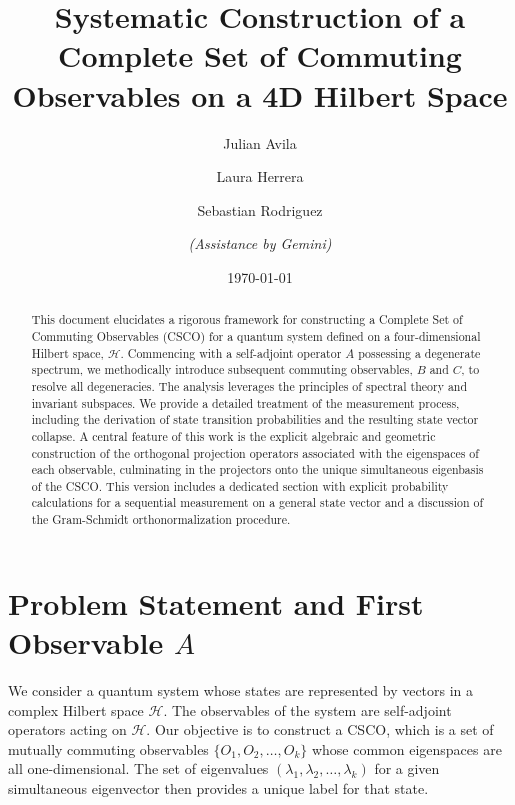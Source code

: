\documentclass[11pt,a4paper]{article}
\title{Systematic Construction of a Complete Set of Commuting Observables on a
4D Hilbert Space}
\author{Julian Avila \and Laura Herrera \and Sebastian Rodriguez \\ \and
\textit{(Assistance by Gemini)}}
\date{\today}
\begin{document}
\maketitle

\begin{abstract}
This document elucidates a rigorous framework for constructing a Complete Set of
Commuting Observables (CSCO) for a quantum system defined on a four-dimensional
Hilbert space, $\mathcal{H}$. Commencing with a self-adjoint operator $A$
possessing a degenerate spectrum, we methodically introduce subsequent commuting
observables, $B$ and $C$, to resolve all degeneracies. The analysis leverages
the principles of spectral theory and invariant subspaces. We provide a detailed
treatment of the measurement process, including the derivation of state
transition probabilities and the resulting state vector collapse. A central
feature of this work is the explicit algebraic and geometric construction of the
orthogonal projection operators associated with the eigenspaces of each
observable, culminating in the projectors onto the unique simultaneous
eigenbasis of the CSCO. This version includes a dedicated section with explicit
probability calculations for a sequential measurement on a general state vector
and a discussion of the Gram-Schmidt orthonormalization procedure.
\end{abstract}

\section{Problem Statement and First Observable \texorpdfstring{$A$}{A}}

We consider a quantum system whose states are represented by vectors in a
complex Hilbert space $\mathcal{H}$. The observables of the system are
self-adjoint operators acting on $\mathcal{H}$. Our objective is to construct a
CSCO, which is a set of mutually commuting observables $\{O_1, O_2, \dots,
O_k\}$ whose common eigenspaces are all one-dimensional. The set of eigenvalues
$(\lambda_1, \lambda_2, \dots, \lambda_k)$ for a given simultaneous eigenvector
then provides a unique label for that state.
\end{document}
